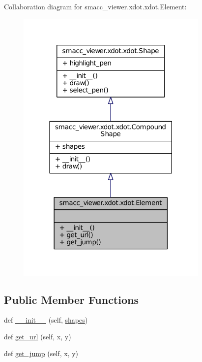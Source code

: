 Collaboration diagram for smacc\+\_\+viewer.\+xdot.\+xdot.\+Element\+:
\nopagebreak
\begin{figure}[H]
\begin{center}
\leavevmode
\includegraphics[width=266pt]{classsmacc__viewer_1_1xdot_1_1xdot_1_1Element__coll__graph}
\end{center}
\end{figure}
\subsection*{Public Member Functions}
\begin{DoxyCompactItemize}
\item 
def \hyperlink{classsmacc__viewer_1_1xdot_1_1xdot_1_1Element_ae7a7e1514e521ea5d101d552793eee95}{\+\_\+\+\_\+init\+\_\+\+\_\+} (self, \hyperlink{classsmacc__viewer_1_1xdot_1_1xdot_1_1CompoundShape_af10de5e0141d75d95ad8b85cb7baf7ea}{shapes})
\item 
def \hyperlink{classsmacc__viewer_1_1xdot_1_1xdot_1_1Element_aeba0e5d49aae3b468da80111459c8ca3}{get\+\_\+url} (self, x, y)
\item 
def \hyperlink{classsmacc__viewer_1_1xdot_1_1xdot_1_1Element_adbd21c49a5e079a629c82ee060c0ac0e}{get\+\_\+jump} (self, x, y)
\end{DoxyCompactItemize}
